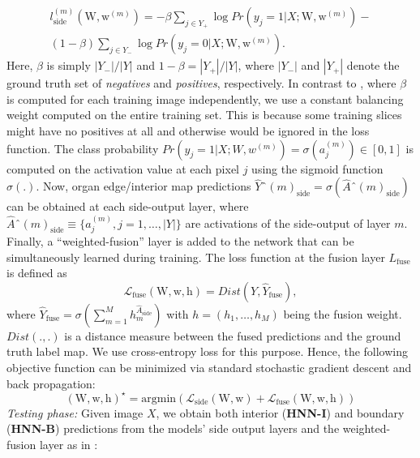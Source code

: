 \documentclass[journal]{IEEEtran}
\begin{document}
\begin{multline}
	l^{(m)}_\mathrm{side}(\bm{\mathrm{W}}, \bm{\mathrm{w}}^{(m)}) = - \beta \sum_{j\in Y_+}\log Pr\left(y_j=1|X;\bm{\mathrm{W}},\bm{\mathrm{w}}^{(m)}\right) - \\
	(1-\beta)\sum_{j\in Y_-}\log Pr\left(y_j=0|X;\bm{\mathrm{W}},\bm{\mathrm{w}}^{(m)}\right).
	\label{equ:hed_loss_balanced}
\end{multline}
Here, $\beta$ is simply $|Y_-|/|Y|$ and $1-\beta = |Y_+|/|Y|$, where $|Y_-|$ and $|Y_+|$ denote the ground truth set of \textit{negatives} and \textit{positives}, respectively. In contrast to \cite{xie2015holistically}, where $\beta$ is computed for each training image independently, we use a constant balancing weight computed on the entire training set. This is because some training slices might have no positives at all and otherwise would be ignored in the loss function. The class probability $Pr(y_j=1|X;W,w^{(m)}) = \sigma(a_j^{(m)}) \in [0,1]$ is computed on the activation value at each pixel $j$ using the sigmoid function $\sigma(.)$. Now, organ edge/interior map predictions $\hat{Y}ˆ{(m)}_\mathrm{side} = \sigma(\hat{A}ˆ{(m)}_\mathrm{side})$ can be obtained at each side-output layer, where $\hat{A}ˆ{(m)}_\mathrm{side} \equiv\{a_j^{(m)}, j = 1,\dots,|Y|\}$ are activations of the side-output of layer $m$. Finally, a ``weighted-fusion'' layer is added to the network that can be simultaneously learned during training. The loss function at the fusion layer $L_\mathrm{fuse}$ is defined as
\begin{equation}
	\mathcal{L}_\mathrm{fuse}(\bm{\mathrm{W}}, \bm{\mathrm{w}}, \bm{\mathrm{h}}) = Dist\left(Y, \hat{Y}_\mathrm{fuse}\right), 
\end{equation}
where $\hat{Y}_\mathrm{fuse} = \sigma \left(\sum^M_{m=1} h_m^{\hat{A}_\mathrm{side}}   \right)$ with $h = \left(h_1,\dots,h_M\right)$ being the fusion weight. $Dist(.,.)$ is a distance measure between the fused predictions and the ground truth label map. We use cross-entropy loss for this purpose. Hence, the following objective function can be minimized via standard stochastic gradient descent and back propagation:
\begin{equation}
	(\bm{\mathrm{W}}, \bm{\mathrm{w}}, \bm{\mathrm{h}})^\star = \mathrm{argmin}\left(\mathcal{L}_\mathrm{side}(\bm{\mathrm{W}}, \bm{\mathrm{w}}) + \mathcal{L}_\mathrm{fuse}(\bm{\mathrm{W}}, \bm{\mathrm{w}}, \bm{\mathrm{h}})\right)
\end{equation}
\textit{Testing phase:} Given image $X$, we obtain both interior (\textbf{HNN-I}) and boundary (\textbf{HNN-B}) predictions from the models' side output layers and the weighted-fusion layer as in \cite{xie2015holistically}:
\end{document}
